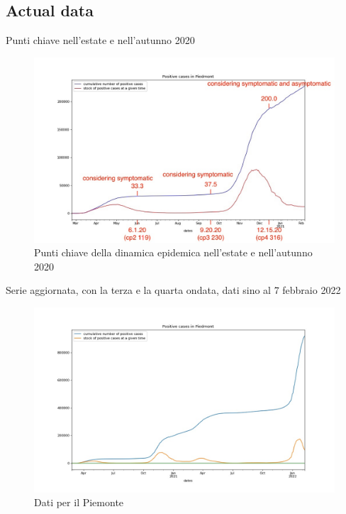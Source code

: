 \documentclass[]{beamer}
\begin{document}
\subsection{Actual data}

\begin{frame}{Punti chiave nell'estate e nell'autunno 2020}

\begin{figure}[H]
\center
\includegraphics[scale=0.25]{andamento900annotato.jpg}
\caption{Punti chiave della dinamica epidemica nell'estate e nell'autunno 2020}
\label{Key points}
\end{figure}


\end{frame}


\begin{frame}{Serie aggiornata, con la terza e la quarta ondata, dati sino al 7 febbraio 2022}

\begin{figure}[H]
\center
\includegraphics[scale=0.35]{andamento900.jpg}
\caption{Dati per il Piemonte}
\label{dataP}
\end{figure}


\end{frame}
\end{document}
